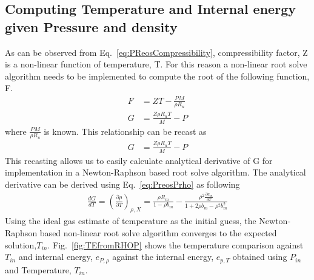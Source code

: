 \documentclass[11pt]{article}
\begin{document}
\subsection{Computing Temperature and Internal energy given Pressure and density}  
As can be observed from Eq.~\ref{eq:PReosCompressibility}, compressibility factor, Z is a non-linear function of temperature, T. For this reason a non-linear root solve algorithm needs to be implemented to compute the root of the following function, F. 
\begin{align}
F &= ZT - \frac{P M}{\rho R_u} \\
G &= \frac{Z \rho R_u T}{M} - P 
\end{align}
where $\frac{P M}{\rho R_u}$ is known. This relationship can be recast as 
\begin{align}
G &= \frac{Z \rho R_u T}{M} - P 
\end{align}
This recasting allows us to easily calculate analytical derivative of G for implementation in a Newton-Raphson based root solve algorithm. The analytical derivative can be derived using Eq.~\ref{eq:PreosPrho} as following
\begin{align}
\frac{dG}{dT} = \left(\frac{\partial \rho}{\partial T} \right)_{\rho, X} = \frac{\rho R_m}{1-\rho b_m} - \frac{\rho^2 \frac{\partial a_m}{\partial T}}{1 + 2\rho b_m - \rho^2 b_m^{2}}
\end{align}
Using the ideal gas estimate of temperature as the initial guess, the Newton-Raphson based non-linear root solve algorithm converges to the expected solution,$T_{in}$. Fig.~\ref{fig:TEfromRHOP} shows the temperature comparison against $T_{in}$ and internal energy, $e_{P,\rho}$ against the internal energy, $e_{p,T}$ obtained using $P_{in}$ and Temperature, $T_{in}$. 
\end{document}
